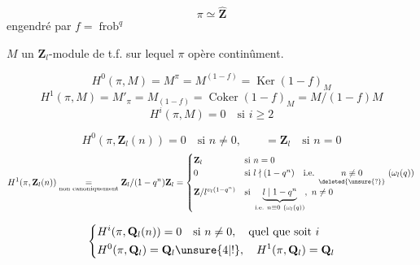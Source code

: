 

\[
\pi\simeq\widehat{\mathbf Z}
\]
engendré par $f=\operatorname{frob}^q$

$M$ un $\mathbf Z_l$-module de t.f. sur lequel $\pi$ opère continûment.

\[
H^0(\pi,M)=M^\pi=M^{(1-f)}=\operatorname{Ker}(1-f)_M
\]
\[
H^1(\pi,M)=M'_\pi=M_{(1-f)}=\operatorname{Coker}(1-f)_M=M/(1-f)M
\]
\[
H^i(\pi,M)=0\quad\text{si }i\geq2
\]

\[
H^0(\pi,\mathbf Z_l(n))=0\quad\text{si }n\neq0,\qquad=\mathbf Z_l\quad\text{si }n=0
\]
\[
H^1(\pi,\mathbf Z_l(n))\underset{\text{non canoniquement}}{=}
\mathbf Z_l/(1-q^n)\mathbf Z_l
=\begin{cases}
\mathbf Z_l&\text{si }n=0\\
0&\text{si }l\nmid(1-q^n)\quad\text{i.e. }\underset{\deleted{\unsure{?}}}{n\not\equiv0}\ (\omega_l(q))\\
\mathbf Z/l^{v_l(1-q^n)}&\text{si }\underbrace{l\mid1-q^n}_{\text{i.e. }n\equiv0\ (\omega_l(q))},\ n\neq0
\end{cases}
\]

\[
\left\{\begin{aligned}
&H^i(\pi,\mathbf Q_l(n))=0\quad\text{si }n\neq0,\quad\text{quel que soit }i\\
&H^0(\pi,\mathbf Q_l)=\mathbf Q_l\unsure{4|!},\quad H^1(\pi,\mathbf Q_l)=\mathbf Q_l
\end{aligned}\right.
\]

